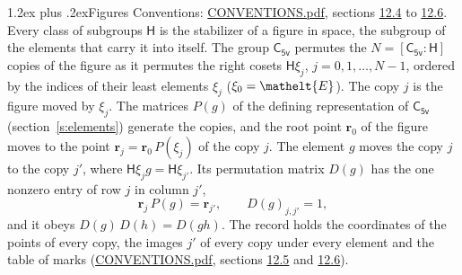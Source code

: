 \documentclass[10pt,a4paper]{article}
\makeatletter
\renewcommand\section{\@startsection{section}{1}{\z@}{-3ex plus -1ex minus -.2ex}%
  {1.2ex plus .2ex}{\normalfont\large\sffamily\bfseries\color{parttitle}}}
\numberwithin{equation}{section}
\newcommand{\eltfont}[1]{{\let\sigma\eltsigma\mathelt{#1}}}
\newcommand{\grp}[1]{\mathsf{#1}}
\newcommand{\cls}[1]{\eltfont{#1}}
\newcommand{\pointr}{\mathbf{r}}
\makeatother
\begin{document}
\section{Figures}\label{s:permutation}
Conventions: \href{../../CONVENTIONS.pdf}{CONVENTIONS.pdf}, sections \href{../../CONVENTIONS.pdf\#conv.12.4}{12.4} to \href{../../CONVENTIONS.pdf\#conv.12.6}{12.6}.
Every class of subgroups $\grp{H}$ is the stabilizer of a figure in space, the subgroup of the elements that carry it into itself. \label{n:local.orbit.size}\label{n:element.coset.least}\label{n:index.coset}The group $\grp{C_{5v}}$ permutes the $N = [\grp{C_{5v}} : \grp{H}]$ copies of the figure as it permutes the right cosets $\grp{H}\xi_j$, $j = 0, 1, \dots, N - 1$, ordered by the indices of their least elements $\xi_j$ ($\xi_0 = \cls{E}$). The copy $j$ is the figure moved by $\xi_j$. The matrices $P(g)$ of the defining representation of $\grp{C_{5v}}$ (section~\ref{s:elements}) generate the copies, and the root point $\pointr_0$ of the figure moves to the point $\pointr_j = \pointr_0\, P(\xi_j)$ of the copy $j$. \label{n:local.coset.image}The element $g$ moves the copy $j$ to the copy $j'$, where $\grp{H}\xi_j g = \grp{H}\xi_{j'}$. \label{n:local.matrix.permutation}Its permutation matrix $D(g)$ has the one nonzero entry of row $j$ in column $j'$,
\begin{equation}\label{e:perm.matrix}\pointr_j\, P(g) = \pointr_{j'}, \qquad D(g)_{j,j'} = 1,\end{equation}
and it obeys $D(g)\, D(h) = D(gh)$. The record holds the coordinates of the points of every copy, the images $j'$ of every copy under every element and the table of marks (\href{../../CONVENTIONS.pdf}{CONVENTIONS.pdf}, sections \href{../../CONVENTIONS.pdf\#conv.12.5}{12.5} and \href{../../CONVENTIONS.pdf\#conv.12.6}{12.6}).
\end{document}
